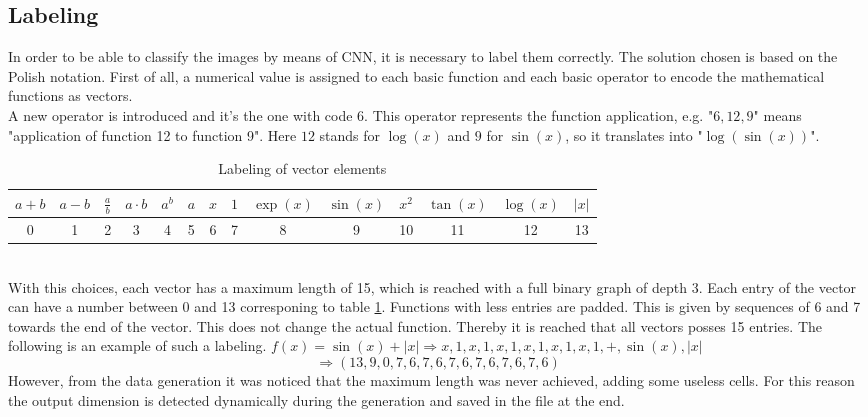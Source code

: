 \subsection{Labeling}
In order to be able to classify the images by means of CNN, it is necessary to label them correctly. The solution chosen is based on the Polish notation.
First of all, a numerical value is assigned to each basic function and each basic operator to encode the mathematical functions as vectors.\\
A new operator is introduced and it's the one with code 6. This operator represents the function application, e.g. "$6,12,9$" means "application of function 12 to function 9". Here $12$ stands for $\log(x)$ and $9$ for $\sin(x)$, so it translates into "$\log(\sin(x))$".\\
\begin{table}[h!]
	\centering
	\begin{tabular}{c|c|c|c|c|c|c|c|c|c|c|c|c|c}
		\(a+b\)&\(a-b\)&$\frac{a}{b}$&\(a \cdot b\)&\(a^b\)&\(a\)&\(x\)&\(1\)&\( \exp(x) \) & \( \sin(x) \) & \( x^2 \) & \( \tan(x) \) & \( \log(x) \) & \( |x| \)\\
		\hline
		0&1&2&3&4&5&6&7&8&9&10&11&12&13
	\end{tabular}
	\caption{Labeling of vector elements}
	\label{table:LabelingVector}
\end{table}\\
With this choices, each vector has a maximum length of 15, which is reached with a full binary graph of depth 3. Each entry of the vector can have a number between 0 and 13 corresponing to table \ref{table:LabelingVector}. Functions with less entries are padded. This is given by sequences of 6 and 7 towards the end of the vector. This does not change the actual function. Thereby it is reached that all vectors posses 15 entries. The following is an example of such a labeling. $f(x) = \sin(x)+|x| \Rightarrow x,1,x,1,x,1,x,1,x,1,x,1,+,\sin(x),|x| $\\
\[ \Rightarrow (13,9,0,7,6,7,6,7,6,7,6,7,6,7,6) \]
However, from the data generation it was noticed that the maximum length was never achieved, adding some useless cells. For this reason the output dimension is detected dynamically during the generation and saved in the file at the end.